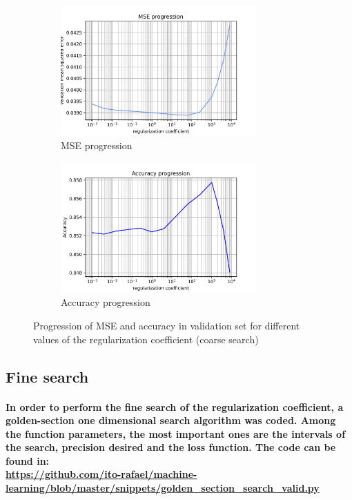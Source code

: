 \documentclass[a4paper]{article}    %
\begin{document}
\begin{figure}[H]
    \centering
    \begin{subfigure}{0.48\textwidth}
        \centering
        \includegraphics[width=7.5cm]{alpha_MSE_coarse_search}
        \caption{MSE progression}
        \label{fig:alpha-coarse-mse}
    \end{subfigure}
    \hfill
    \begin{subfigure}{0.48\textwidth}
        \centering
        \includegraphics[width=7.5cm]{alpha_ACCURACY_coarse_search}
        \caption{Accuracy progression}
        \label{fig:alpha-coarse-acc}
    \end{subfigure}
    \hfill
    \caption{Progression of MSE and accuracy in validation set for different values of the regularization coefficient (coarse search)}
    \label{fig:alpha_coarse}
\end{figure}

\subsection{Fine search}

\paragraph{In order to perform the fine search of the regularization coefficient, a golden-section one dimensional search algorithm was coded. Among the function parameters, the most important ones are the intervals of the search, precision desired and the loss function. The code can be found in:\\
\url{https://github.com/ito-rafael/machine-learning/blob/master/snippets/golden_section_search_valid.py}}
\end{document}
